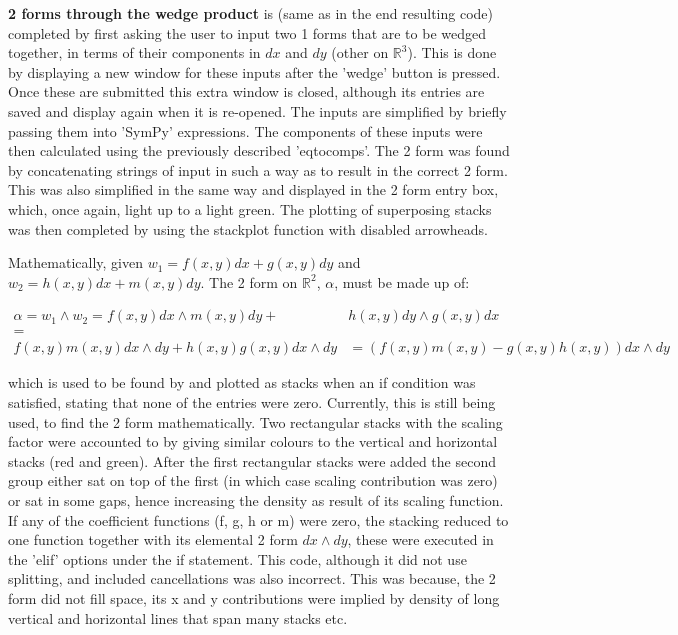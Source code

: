 \documentclass[11]{report}
\begin{document}
\textbf{2 forms through the wedge product} is (same as in the end resulting code) completed by first asking the user to input two 1 forms that are to be wedged together, in terms of their components in $dx$ and $dy$ (other on $\mathbb{R}^{3}$). This is done by displaying a new window for these inputs after the 'wedge' button is pressed. Once these are submitted this extra window is closed, although its entries are saved and display again when it is re-opened. The inputs are simplified by briefly passing them into 'SymPy' expressions. The components of these inputs were then calculated using the previously described 'eq\textunderscore to\textunderscore comps'. The 2 form was found by concatenating strings of input in such a way as to result in the correct 2 form. This was also simplified in the same way and displayed in the 2 form entry box, which, once again, light up to a light green. The plotting of superposing stacks was then completed by using the stack\textunderscore plot function with disabled arrowheads.

Mathematically, given $w_{1} = f(x, y) dx + g(x, y) dy$  and $w_{2} = h(x, y) dx + m(x, y) dy$. The 2 form on $\mathbb{R}^{2}$, $\alpha$, must be made up of:


\begin{equation}
	\label{T2} \begin{split}
		\alpha = w_{1}\wedge w_{2} = f(x, y) dx\wedge m(x, y) dy + &h(x, y) dy\wedge g(x, y) dx \\
		= \\
		f(x, y)m(x, y) dx\wedge dy + h(x, y)g(x, y) dx\wedge dy &= (f(x, y)m(x, y) - g(x, y)h(x, y)) dx\wedge dy  
	\end{split}
\end{equation}


which is used to be found by and plotted as stacks when an if condition was satisfied, stating that none of the entries were zero. Currently, this is still being used, to find the 2 form mathematically.
Two rectangular stacks with the scaling factor were accounted to by giving similar colours to the vertical  and horizontal stacks (red and green). After the first rectangular stacks were added the second group either sat on top of the first (in which case scaling contribution was zero) or sat in some gaps, hence increasing the density as result of its scaling function.
If any of the coefficient functions (f, g, h or m) were zero, the stacking reduced to one function together with its elemental 2 form $dx\wedge dy$, these were executed in the 'elif' options under the if statement. This code, although it did not use splitting, and included cancellations was also incorrect. This was because, the 2 form did not fill space, its x and y contributions were implied by density of long vertical and horizontal lines that span many stacks etc.
\end{document}
